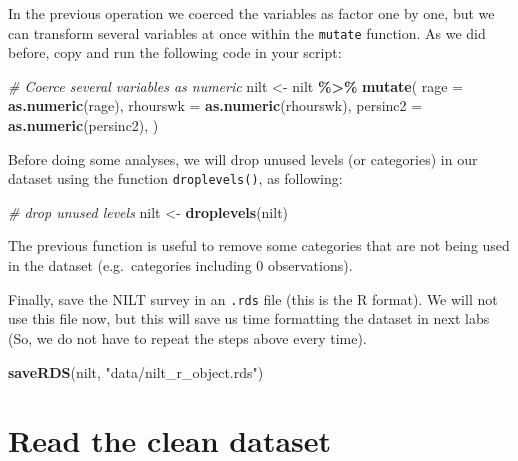 \documentclass[
]{book}
\newenvironment{Shaded}{\begin{snugshade}}{\end{snugshade}}
\newcommand{\AttributeTok}[1]{\textcolor[rgb]{0.13,0.29,0.53}{#1}}
\newcommand{\CommentTok}[1]{\textcolor[rgb]{0.56,0.35,0.01}{\textit{#1}}}
\newcommand{\FunctionTok}[1]{\textcolor[rgb]{0.13,0.29,0.53}{\textbf{#1}}}
\newcommand{\NormalTok}[1]{#1}
\newcommand{\OtherTok}[1]{\textcolor[rgb]{0.56,0.35,0.01}{#1}}
\newcommand{\SpecialCharTok}[1]{\textcolor[rgb]{0.81,0.36,0.00}{\textbf{#1}}}
\newcommand{\StringTok}[1]{\textcolor[rgb]{0.31,0.60,0.02}{#1}}
\begin{document}
In the previous operation we coerced the variables as factor one by one, but we can transform several variables at once within the \texttt{mutate} function. As we did before, copy and run the following code in your script:

\begin{Shaded}
\begin{Highlighting}[]
\CommentTok{\# Coerce several variables as numeric}
\NormalTok{nilt }\OtherTok{\textless{}{-}}\NormalTok{ nilt }\SpecialCharTok{\%\textgreater{}\%} 
  \FunctionTok{mutate}\NormalTok{(}
    \AttributeTok{rage =} \FunctionTok{as.numeric}\NormalTok{(rage),}
    \AttributeTok{rhourswk =} \FunctionTok{as.numeric}\NormalTok{(rhourswk),}
    \AttributeTok{persinc2 =} \FunctionTok{as.numeric}\NormalTok{(persinc2),}
\NormalTok{  )}
\end{Highlighting}
\end{Shaded}

Before doing some analyses, we will drop unused levels (or categories) in our dataset using the function \texttt{droplevels()}, as following:

\begin{Shaded}
\begin{Highlighting}[]
\CommentTok{\# drop unused levels}
\NormalTok{nilt }\OtherTok{\textless{}{-}} \FunctionTok{droplevels}\NormalTok{(nilt)}
\end{Highlighting}
\end{Shaded}

The previous function is useful to remove some categories that are not being used in the dataset (e.g.~categories including 0 observations).

Finally, save the NILT survey in an \texttt{.rds} file (this is the R format). We will not use this file now, but this will save us time formatting the dataset in next labs (So, we do not have to repeat the steps above every time).

\begin{Shaded}
\begin{Highlighting}[]
\FunctionTok{saveRDS}\NormalTok{(nilt, }\StringTok{"data/nilt\_r\_object.rds"}\NormalTok{)}
\end{Highlighting}
\end{Shaded}

\hypertarget{read-the-clean-dataset}{%
\section{Read the clean dataset}\label{read-the-clean-dataset}}
\end{document}
